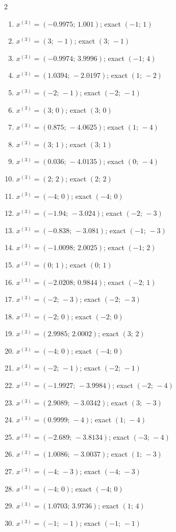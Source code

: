 \begin{multicols}{2}\raggedright
\begin{enumerate}[label=\arabic*., leftmargin=*, itemsep=1pt]
\item $x^{(3)}=(-0.9975;\,1.001)$; exact $(-1;\,1)$
\item $x^{(3)}=(3;\,-1)$; exact $(3;\,-1)$
\item $x^{(3)}=(-0.9974;\,3.9996)$; exact $(-1;\,4)$
\item $x^{(3)}=(1.0394;\,-2.0197)$; exact $(1;\,-2)$
\item $x^{(3)}=(-2;\,-1)$; exact $(-2;\,-1)$
\item $x^{(3)}=(3;\,0)$; exact $(3;\,0)$
\item $x^{(3)}=(0.875;\,-4.0625)$; exact $(1;\,-4)$
\item $x^{(3)}=(3;\,1)$; exact $(3;\,1)$
\item $x^{(3)}=(0.036;\,-4.0135)$; exact $(0;\,-4)$
\item $x^{(3)}=(2;\,2)$; exact $(2;\,2)$
\item $x^{(3)}=(-4;\,0)$; exact $(-4;\,0)$
\item $x^{(3)}=(-1.94;\,-3.024)$; exact $(-2;\,-3)$
\item $x^{(3)}=(-0.838;\,-3.081)$; exact $(-1;\,-3)$
\item $x^{(3)}=(-1.0098;\,2.0025)$; exact $(-1;\,2)$
\item $x^{(3)}=(0;\,1)$; exact $(0;\,1)$
\item $x^{(3)}=(-2.0208;\,0.9844)$; exact $(-2;\,1)$
\item $x^{(3)}=(-2;\,-3)$; exact $(-2;\,-3)$
\item $x^{(3)}=(-2;\,0)$; exact $(-2;\,0)$
\item $x^{(3)}=(2.9985;\,2.0002)$; exact $(3;\,2)$
\item $x^{(3)}=(-4;\,0)$; exact $(-4;\,0)$
\item $x^{(3)}=(-2;\,-1)$; exact $(-2;\,-1)$
\item $x^{(3)}=(-1.9927;\,-3.9984)$; exact $(-2;\,-4)$
\item $x^{(3)}=(2.9089;\,-3.0342)$; exact $(3;\,-3)$
\item $x^{(3)}=(0.9999;\,-4)$; exact $(1;\,-4)$
\item $x^{(3)}=(-2.689;\,-3.8134)$; exact $(-3;\,-4)$
\item $x^{(3)}=(1.0086;\,-3.0037)$; exact $(1;\,-3)$
\item $x^{(3)}=(-4;\,-3)$; exact $(-4;\,-3)$
\item $x^{(3)}=(-4;\,0)$; exact $(-4;\,0)$
\item $x^{(3)}=(1.0703;\,3.9736)$; exact $(1;\,4)$
\item $x^{(3)}=(-1;\,-1)$; exact $(-1;\,-1)$
\end{enumerate}
\end{multicols}
